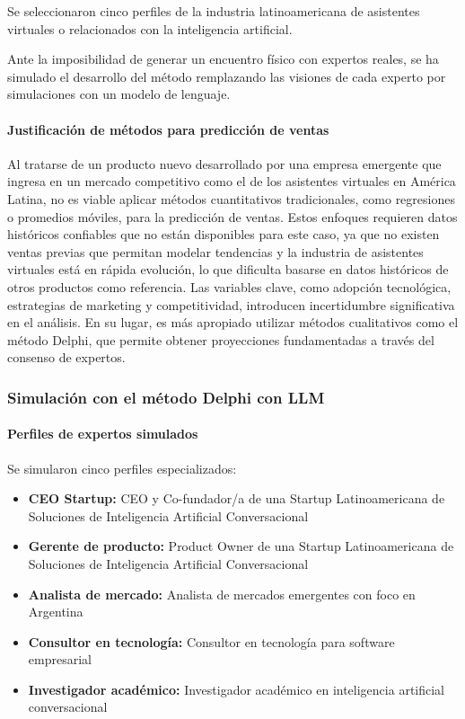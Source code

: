 Se seleccionaron cinco perfiles de la industria latinoamericana de asistentes virtuales o relacionados con la inteligencia artificial.

Ante la imposibilidad de generar un encuentro físico con expertos reales, se ha simulado el desarrollo del método remplazando las visiones de cada experto por simulaciones con un modelo de lenguaje.

\paragraph{Justificación de métodos para predicción de ventas}

Al tratarse de un producto nuevo desarrollado por una empresa emergente que ingresa en un mercado competitivo como el de los asistentes virtuales en América Latina, no es viable aplicar métodos cuantitativos tradicionales, como regresiones o promedios móviles, para la predicción de ventas. Estos enfoques requieren datos históricos confiables que no están disponibles para este caso, ya que no existen ventas previas que permitan modelar tendencias y la industria de asistentes virtuales está en rápida evolución, lo que dificulta basarse en datos históricos de otros productos como referencia. Las variables clave, como adopción tecnológica, estrategias de marketing y competitividad, introducen incertidumbre significativa en el análisis. En su lugar, es más apropiado utilizar métodos cualitativos como el método Delphi, que permite obtener proyecciones fundamentadas a través del consenso de expertos.

\subsubsection{Simulación con el método Delphi con LLM}

\paragraph{Perfiles de expertos simulados}

Se simularon cinco perfiles especializados:
\begin{itemize}
    \item \textbf{CEO Startup:} CEO y Co-fundador/a de una Startup Latinoamericana de Soluciones de Inteligencia Artificial Conversacional
    \item \textbf{Gerente de producto:} Product Owner de una Startup Latinoamericana de Soluciones de Inteligencia Artificial Conversacional
    \item \textbf{Analista de mercado:} Analista de mercados emergentes con foco en Argentina
    \item \textbf{Consultor en tecnología:} Consultor en tecnología para software empresarial
    \item \textbf{Investigador académico:} Investigador académico en inteligencia artificial conversacional
\end{itemize}

